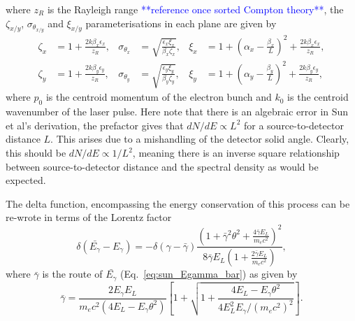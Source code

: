\documentclass[../main.tex]{subfiles}
\begin{document}
where $z_{R}$ is the Rayleigh range \textcolor{blue}{**reference once sorted Compton theory**}, the $\zeta_{x/y}$, $\sigma_{\theta_{x/y}}$ and  $\xi_{x/y}$ parameterisations in each plane are given by
\begin{align}
\zeta_{x} &= 1+\frac{2k\beta_{x}\epsilon_{x}}{z_{R}}, & \sigma_{\theta_{x}} &= \sqrt{\frac{\epsilon_{x}\xi_{x}}{\beta_{x}\zeta_{x}}}, & \xi_{x} &= 1+\left(\alpha_{x}-\frac{\beta_{x}}{L}\right)^{2}+\frac{2k\beta_{x}\epsilon_{x}}{z_{R}}, \nonumber\\
\zeta_{y} &= 1+\frac{2k\beta_{y}\epsilon_{y}}{z_{R}}, & \sigma_{\theta_{y}} &= \sqrt{\frac{\epsilon_{y}\xi_{y}}{\beta_{y}\zeta_{y}}}, & \xi_{y} &= 1+\left(\alpha_{y}-\frac{\beta_{y}}{L}\right)^{2}+\frac{2k\beta_{y}\epsilon_{y}}{z_{R}}, 
\label{eq:zeta_sigmatheta_xi_parameters_sun}
\end{align}
where $p_{0}$ is the centroid momentum of the electron bunch and $k_{0}$ is the centroid wavenumber of the laser pulse. Here note that there is an algebraic error in Sun et al's \cite{sun2009characterizations,sun2011theoretical} derivation, the prefactor gives that $dN/dE\propto L^{2}$ for a source-to-detector distance $L$. This arises due to a mishandling of the detector solid angle. Clearly, this should be $dN/dE\propto 1/L^{2}$, meaning there is an inverse square relationship between source-to-detector distance and the spectral density as would be expected. 

The delta function, encompassing the energy conservation of this process can be re-wrote in terms of the Lorentz factor
\begin{equation}
\delta\left(\bar{E_{\gamma}}-E_{\gamma}\right) = -\delta\left(\gamma-\bar{\gamma}\right)\frac{\left(1+\bar{\gamma}^{2}\theta^{2}+\frac{4\bar{\gamma}E_{L}}{m_{e}c^{2}}\right)^{2}}{8\bar{\gamma}E_{L}\left(1+\frac{2\bar{\gamma}E_{L}}{m_{e}c^{2}}\right)},
\label{eq:sun_electron_energy_delta_function}    
\end{equation}
where $\bar{\gamma}$ is the route of $\bar{E_{\gamma}}$ (Eq.~\ref{eq:sun_Egamma_bar}) as given by
\begin{equation}
\bar{\gamma} = \frac{2E_{\gamma}E_{L}}{m_{e}c^{2}\left(4E_{L}-E_{\gamma}\theta^{2}\right)}\left[1+\sqrt{1+\frac{4E_{L}-E_{\gamma}\theta^{2}}{4E_{L}^{2}E_{\gamma}/\left(m_{e}c^{2}\right)^{2}}}\right].    
\end{equation}
\end{document}
